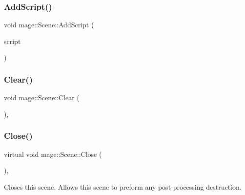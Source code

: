 \hypertarget{classmage_1_1_scene_ab97b66c81c32681699052e154d0e0722}{}\label{classmage_1_1_scene_ab97b66c81c32681699052e154d0e0722} 
\subsubsection{\texorpdfstring{Add\+Script()}{AddScript()}}
{\footnotesize\ttfamily void mage\+::\+Scene\+::\+Add\+Script (\begin{DoxyParamCaption}\item[{\hyperlink{namespacemage_a1e01ae66713838a7a67d30e44c67703e}{Shared\+Ptr}$<$ \hyperlink{classmage_1_1_behavior_script}{Behavior\+Script} $>$}]{script }\end{DoxyParamCaption})}

\hypertarget{classmage_1_1_scene_adf4a5b3885e34336caa5f145f55e01e1}{}\label{classmage_1_1_scene_adf4a5b3885e34336caa5f145f55e01e1} 
\subsubsection{\texorpdfstring{Clear()}{Clear()}}
{\footnotesize\ttfamily void mage\+::\+Scene\+::\+Clear (\begin{DoxyParamCaption}{ }\end{DoxyParamCaption})\hspace{0.3cm}{\ttfamily [private]}, {\ttfamily [noexcept]}}

\hypertarget{classmage_1_1_scene_a16786d7fcf0b813e2e94061b082cfd1d}{}\label{classmage_1_1_scene_a16786d7fcf0b813e2e94061b082cfd1d} 
\subsubsection{\texorpdfstring{Close()}{Close()}}
{\footnotesize\ttfamily virtual void mage\+::\+Scene\+::\+Close (\begin{DoxyParamCaption}{ }\end{DoxyParamCaption})\hspace{0.3cm}{\ttfamily [private]}, {\ttfamily [virtual]}}

Closes this scene. Allows this scene to preform any post-\/processing destruction. \hypertarget{classmage_1_1_scene_a9a46c7e0624aec7b5aa2f0ba77b55386}{}\label{classmage_1_1_scene_a9a46c7e0624aec7b5aa2f0ba77b55386} 
